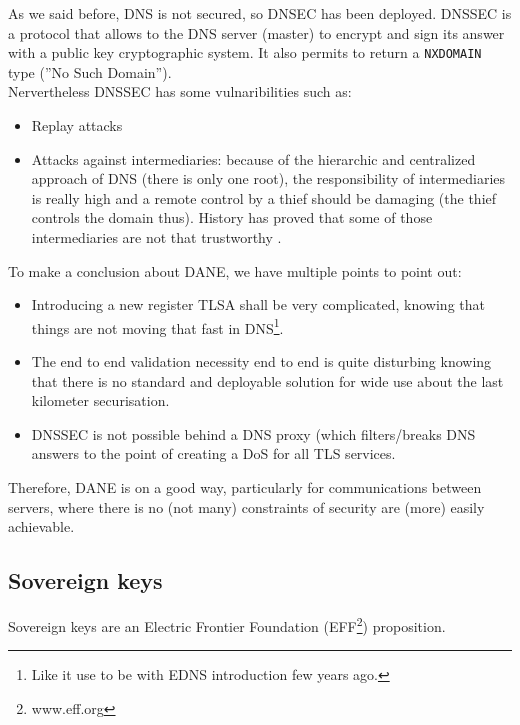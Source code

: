 \documentclass[journal, a4paper]{IEEEtran}
\begin{document}
As we said before, DNS is not secured, so DNSEC has been deployed. DNSSEC is a protocol that allows to the DNS server (master) to encrypt and sign its answer with a public key cryptographic system. It also permits to return a \verb$NXDOMAIN$ type (''No Such Domain'').\\
Nervertheless DNSSEC has some vulnaribilities such as:
\begin{itemize}
	\item Replay attacks
	\item Attacks against intermediaries: because of the hierarchic and centralized approach of DNS (there is only one root), the responsibility of intermediaries is really high and a remote control by a thief should be damaging (the thief controls the domain thus). History has proved that some of those intermediaries are not that trustworthy \cite{dan08} \cite{utk11}.
\end{itemize}

To make a conclusion about DANE, we have multiple points to point out:
\begin{itemize}
	\item Introducing a new register TLSA shall be very complicated, knowing that things are not moving that fast in DNS\footnote{Like it use to be with EDNS introduction few years ago.}.
	\item The end to end validation necessity end to end is quite disturbing knowing that there is no standard and deployable solution for wide use  about the last kilometer securisation.
	\item DNSSEC is not possible behind a DNS proxy (which filters/breaks DNS answers to the point of creating a DoS for all TLS services.
\end{itemize}

Therefore, DANE is on a good way, particularly for communications between servers, where there is no (not many) constraints of security are (more) easily achievable. 

\subsection{Sovereign keys}
\label{sovkeys}

Sovereign keys are an Electric Frontier Foundation (EFF\footnote{www.eff.org}) proposition.
\end{document}
